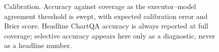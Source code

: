 \begin{figure}[t]
\centering
\caption{Calibration. Accuracy against coverage as the executor--model agreement threshold is swept, with expected calibration error and Brier score. Headline ChartQA accuracy is always reported at full coverage; selective accuracy appears here only as a diagnostic, never as a headline number.}
\label{fig:calibration}
\end{figure}
